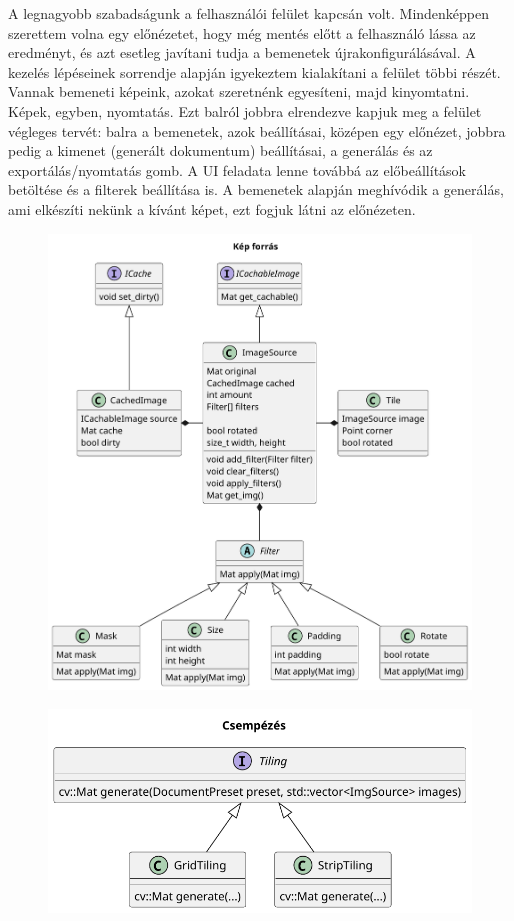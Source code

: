 A legnagyobb szabadságunk a felhasználói felület kapcsán volt. Mindenképpen szerettem volna egy előnézetet, hogy még mentés előtt a felhasználó lássa az eredményt, és azt esetleg javítani tudja a bemenetek újrakonfigurálásával. A kezelés lépéseinek sorrendje alapján igyekeztem kialakítani a felület többi részét. Vannak bemeneti képeink, azokat szeretnénk egyesíteni, majd kinyomtatni. Képek, egyben, nyomtatás. Ezt balról jobbra elrendezve kapjuk meg a felület végleges tervét: balra a bemenetek, azok beállításai, középen egy előnézet, jobbra pedig a kimenet (generált dokumentum) beállításai, a generálás és az exportálás/nyomtatás gomb. A UI feladata lenne továbbá az előbeállítások betöltése és a filterek beállítása is. A bemenetek alapján meghívódik a generálás, ami elkészíti nekünk a kívánt képet, ezt fogjuk látni az előnézeten.



\begin{figure}[h]
    \centering
    \includegraphics[width=15cm]{figures/uml/img_source.pdf}
    \label{fig:ImageSource_uml}
\end{figure}

\begin{figure}
    \centering
    \includegraphics[width=12cm]{figures/uml/tiling.pdf}
    \label{fig:Tiling_uml}
\end{figure}

